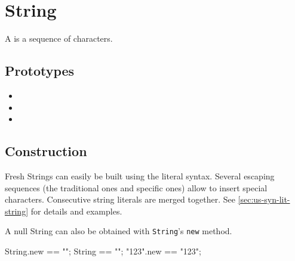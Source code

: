 \section{String}

A  is a sequence of characters.

\subsection{Prototypes}
\begin{itemize}
\item {}
\item {}
\item {}
\end{itemize}

\subsection{Construction}
Fresh Strings can easily be built using the literal syntax.  Several
escaping sequences (the traditional ones and \us specific ones) allow
to insert special characters.  Consecutive string literals are merged
together.  See \autoref{sec:us-syn-lit-string} for details and
examples.

A null String can also be obtained with \lstinline|String|'s
\lstinline|new| method.

\begin{urbiassert}[firstnumber=1]
String.new == "";
String == "";
"123".new == "123";
\end{urbiassert}

